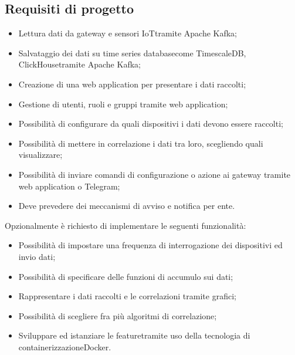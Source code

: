 \subsection{Requisiti di progetto}
\begin{itemize}
	\item Lettura dati da gateway e sensori IoT\glosp tramite Apache Kafka\glo;
	\item Salvataggio dei dati su time series database\glosp come TimescaleDB\glo, ClickHouse\glosp tramite Apache Kafka\glo;
	\item Creazione di una web application per presentare i dati raccolti;
	\item Gestione di utenti, ruoli e gruppi tramite web application;
	\item Possibilità di configurare da quali dispositivi i dati devono essere raccolti;
	\item Possibilità di mettere in correlazione i dati tra loro, scegliendo quali visualizzare;
	\item Possibilità di inviare comandi di configurazione o azione ai gateway tramite web application o Telegram\glo;
	\item Deve prevedere dei meccanismi di avviso e notifica per ente.
\end{itemize}
Opzionalmente è richiesto di implementare le seguenti funzionalità:
\begin{itemize}
	\item Possibilità di impostare una frequenza di interrogazione dei dispositivi ed invio dati;
	\item Possibilità di specificare delle funzioni di accumulo sui dati;
	\item Rappresentare i dati raccolti e le correlazioni tramite grafici;
	\item Possibilità di scegliere fra più algoritmi di correlazione;
	\item Sviluppare ed istanziare le feature\glosp tramite uso della tecnologia di containerizzazione\glosp Docker\glo.
\end{itemize}

